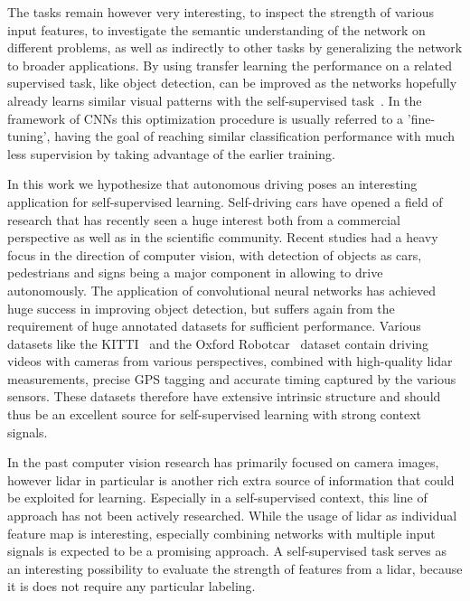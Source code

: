 The tasks remain however very interesting, to inspect the strength of various input features, to investigate the semantic understanding of the network on different problems, as well as indirectly to other tasks by generalizing the network to broader applications. By using transfer learning the performance on a related supervised task, like object detection, can be improved as the networks hopefully already learns similar visual patterns with the self-supervised task~\cite{raina2007}. In the framework of CNNs this optimization procedure is usually referred to a 'fine-tuning', having the goal of reaching similar classification performance with much less supervision by taking advantage of the earlier training.

In this work we hypothesize that autonomous driving poses an interesting application for self-supervised learning. Self-driving cars have opened a field of research that has recently seen a huge interest both from a commercial perspective as well as in the scientific community. Recent studies had a heavy focus in the direction of computer vision, with detection of objects as cars, pedestrians and signs being a major component in allowing to drive autonomously. The application of convolutional neural networks has achieved huge success in improving object detection\cite{bojarski2016end}, but suffers again from the requirement of huge annotated datasets for sufficient performance. Various datasets like the KITTI~\cite{geiger2012} and the Oxford Robotcar~\cite{maddern2017} dataset contain driving videos with cameras from various perspectives, combined with high-quality lidar measurements, precise GPS tagging and accurate timing captured by the various sensors. These datasets therefore have extensive intrinsic structure and should thus be an excellent source for self-supervised learning with strong context signals. 

In the past computer vision research has primarily focused on camera images, however lidar in particular is another rich extra source of information that could be exploited for learning. Especially in a self-supervised context, this line of approach has not been actively researched. While the usage of lidar as individual feature map is interesting, especially combining networks with multiple input signals is expected to be a promising approach. A self-supervised task serves as an interesting possibility to evaluate the strength of features from a lidar, because it is does not require any particular labeling.

